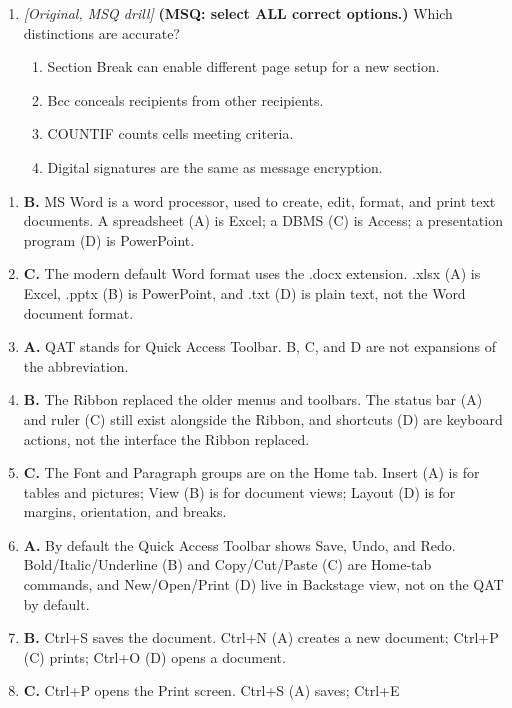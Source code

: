 \begin{enumerate}[label=\textbf{Q\arabic*.}, leftmargin=*]
\item \textit{[Original, MSQ drill]} \textbf{(MSQ: select ALL correct options.)} Which distinctions are accurate?
  \begin{enumerate}[label=\Alph*.]
\item Section Break can enable different page setup for a new section.
   \item Bcc conceals recipients from other recipients.
   \item COUNTIF counts cells meeting criteria.
   \item Digital signatures are the same as message encryption.
  \end{enumerate}

\end{enumerate}
\begin{enumerate}[label=\textbf{Q\arabic*.}, leftmargin=*]
\item \textbf{B.} MS Word is a word processor, used to create, edit, format,
  and print text documents. A spreadsheet (A) is Excel; a DBMS (C) is Access;
  a presentation program (D) is PowerPoint.
\item \textbf{C.} The modern default Word format uses the .docx extension.
  .xlsx (A) is Excel, .pptx (B) is PowerPoint, and .txt (D) is plain text,
  not the Word document format.
\item \textbf{A.} QAT stands for Quick Access Toolbar. B, C, and D are not
  expansions of the abbreviation.
\item \textbf{B.} The Ribbon replaced the older menus and toolbars. The
  status bar (A) and ruler (C) still exist alongside the Ribbon, and
  shortcuts (D) are keyboard actions, not the interface the Ribbon replaced.
\item \textbf{C.} The Font and Paragraph groups are on the Home tab. Insert
  (A) is for tables and pictures; View (B) is for document views; Layout (D)
  is for margins, orientation, and breaks.
\item \textbf{A.} By default the Quick Access Toolbar shows Save, Undo, and
  Redo. Bold/Italic/Underline (B) and Copy/Cut/Paste (C) are Home-tab
  commands, and New/Open/Print (D) live in Backstage view, not on the QAT by
  default.
\item \textbf{B.} Ctrl+S saves the document. Ctrl+N (A) creates a new
  document; Ctrl+P (C) prints; Ctrl+O (D) opens a document.
\item \textbf{C.} Ctrl+P opens the Print screen. Ctrl+S (A) saves; Ctrl+E

\end{enumerate}
